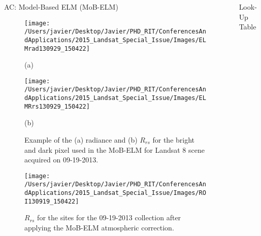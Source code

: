 \documentclass{beamer}
\begin{document}
\begin{frame}{}
\begin{columns}[t]
\begin{column}{.31\linewidth}
\begin{block}{AC: Model-Based ELM (MoB-ELM)}
\begin{figure}[htb]
  \begin{minipage}[c]{0.49\linewidth}
    \centering
      \texttt{[image: /Users/javier/Desktop/Javier/PHD\_RIT/ConferencesAndApplications/2015\_Landsat\_Special\_Issue/Images/ELMrad130929\_150422]}\\
    \centerline{\small (a)}\medskip
  \end{minipage}
  \hspace{-.5cm}
  \begin{minipage}[d]{0.49\linewidth}
    \centering
      \texttt{[image: /Users/javier/Desktop/Javier/PHD\_RIT/ConferencesAndApplications/2015\_Landsat\_Special\_Issue/Images/ELMRrs130929\_150422]}\\
    \centerline{\small (b)}\medskip
  \end{minipage}
  \caption{Example of the (a) radiance and (b) $R_{rs}$ for the bright and dark pixel used in the MoB-ELM for Landsat 8 scene acquired on 09-19-2013.\label{fig:MOBELMpxls} } 
\end{figure}

\begin{figure}[htbp!]
  \centering
  \texttt{[image: /Users/javier/Desktop/Javier/PHD\_RIT/ConferencesAndApplications/2015\_Landsat\_Special\_Issue/Images/ROI130919\_150422]}
  \caption{$R_{rs}$ for the sites for the 09-19-2013 collection after applying the MoB-ELM atmospheric correction.\label{fig:RrsROIs130919} } 
\end{figure}
\vspace{-.2cm}
\end{block}


\end{column}
 \begin{column}{.31\linewidth}
\begin{block}{Look-Up Table}



\end{block}
\end{column}
\end{columns}
\end{frame}
\end{document}
